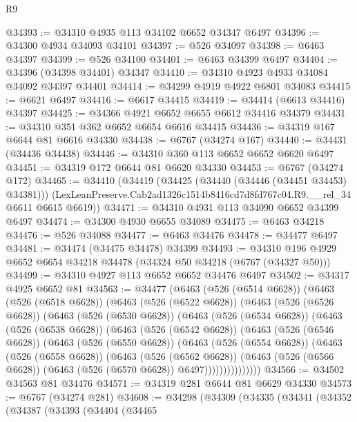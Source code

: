 \begin{lexlean}{R9}
\begin{coremodule}
@34393 := @34310 @4935 @113 @34102 @6652 @34347 @6497
@34396 := @34300 @4934 @34093 @34101
@34397 := @526 @34097
@34398 := @6463 @34397
@34399 := @526 @34100
@34401 := @6463 @34399 @6497
@34404 := @34396 (@34398 @34401) @34347
@34410 := @34310 @4923 @4933 @34084 @34092 @34397 @34401
@34414 := @34299 @4919 @4922 @6801 @34083
@34415 := @6621 @6497
@34416 := @6617 @34415
@34419 := @34414 (@6613 @34416) @34397
@34425 := @34366 @4921 @6652 @6655 @6612 @34416 @34379
@34431 := @34310 @351 @362 @6652 @6654 @6616 @34415
@34436 := @34319 @167 @6644 @81 @6616 @34330
@34438 := @6767 (@34274 @167)
@34440 := @34431 (@34436 @34438)
@34446 := @34310 @360 @113 @6652 @6652 @6620 @6497
@34451 := @34319 @172 @6644 @81 @6620 @34330
@34453 := @6767 (@34274 @172)
@34465 := @34410
    (@34419
      (@34425 (@34440 (@34446 (@34451 @34453) @34381)))
      (LexLeanPreserve.Cab2ad1326c1514b8416cd7d8fd767c04.R9.__rel_34 @6611 @6615 @6619))
@34471 := @34310 @4931 @113 @34090 @6652 @34399 @6497
@34474 := @34300 @4930 @6655 @34089
@34475 := @6463 @34218
@34476 := @526 @34088
@34477 := @6463 @34476
@34478 := @34477 @6497
@34481 := @34474 (@34475 @34478) @34399
@34493 := @34310 @196 @4929 @6652 @6654 @34218 @34478 (@34324 @50 @34218 (@6767 (@34327 @50)))
@34499 := @34310 @4927 @113 @6652 @6652 @34476 @6497
@34502 := @34317 @4925 @6652 @81
@34563 := @34477
    (@6463
      (@526 (@6514 @6628))
      (@6463
        (@526 (@6518 @6628))
        (@6463
          (@526 (@6522 @6628))
          (@6463
            (@526 (@6526 @6628))
            (@6463
              (@526 (@6530 @6628))
              (@6463
                (@526 (@6534 @6628))
                (@6463
                  (@526 (@6538 @6628))
                  (@6463
                    (@526 (@6542 @6628))
                    (@6463
                      (@526 (@6546 @6628))
                      (@6463
                        (@526 (@6550 @6628))
                        (@6463
                          (@526 (@6554 @6628))
                          (@6463
                            (@526 (@6558 @6628))
                            (@6463
                              (@526 (@6562 @6628))
                              (@6463
                                (@526 (@6566 @6628))
                                (@6463 (@526 (@6570 @6628)) @6497)))))))))))))))
@34566 := @34502 @34563 @81 @34476
@34571 := @34319 @281 @6644 @81 @6629 @34330
@34573 := @6767 (@34274 @281)
@34608 := @34298
    (@34309
      (@34335
        (@34341
          (@34352
            (@34387
              (@34393
                (@34404
                  (@34465

\end{coremodule}
\end{lexlean}
